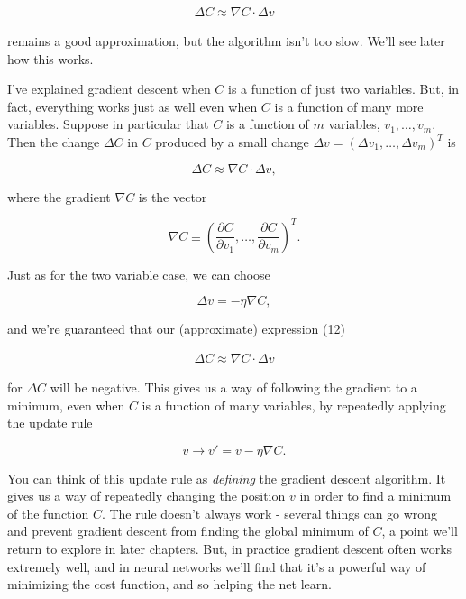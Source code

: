 \begin{align*}
\Delta C \approx \nabla C \cdot \Delta v \nonumber
\end{align*}

\noindent remains a good approximation, but the algorithm isn't too slow. We'll see later how this works.


I've explained gradient descent when $C$ is a function of just two variables. But, in fact, everything works just as well even when $C$ is a function of many more variables. Suppose in particular that $C$ is a function of $m$ variables, $v_1,\ldots,v_m$. Then the change $\Delta C$ in $C$ produced by a small change $\Delta v = (\Delta v_1, \ldots, \Delta v_m)^T$ is

\begin{equation}
\Delta C \approx \nabla C \cdot \Delta v,
\tag{12}
\end{equation}

\noindent where the gradient $\nabla C$ is the vector

\begin{equation}
\nabla C \equiv \left(\frac{\partial C}{\partial v_1}, \ldots, \frac{\partial C}{\partial v_m}\right)^T.
\tag{13}
\end{equation}

\noindent Just as for the two variable case, we can choose

\begin{equation}
\Delta v = -\eta \nabla C,
\tag{14}
\end{equation}

\noindent and we're guaranteed that our (approximate) expression (12)

\begin{align*}
\Delta C \approx \nabla C \cdot \Delta v \nonumber
\end{align*}

\noindent for $\Delta C$ will be negative. This gives us a way of following the gradient to a minimum, even when $C$ is a function of many variables, by repeatedly applying the update rule

\begin{equation}
v \rightarrow v' = v-\eta \nabla C.
\tag{15}
\end{equation}

\noindent You can think of this update rule as \emph{defining} the gradient descent algorithm. It gives us a way of repeatedly changing the position $v$ in order to find a minimum of the function $C$. The rule doesn't always work - several things can go wrong and prevent gradient descent from finding the global minimum of $C$, a point we'll return to explore in later chapters. But, in practice gradient descent often works extremely well, and in neural networks we'll find that it's a powerful way of minimizing the cost function, and so helping the net learn.


